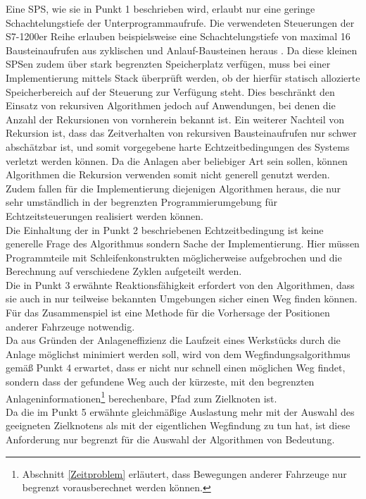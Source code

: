 		Eine \ac{SPS}, wie sie in Punkt 1 beschrieben wird, erlaubt nur eine geringe Schachtelungstiefe der Unterprogrammaufrufe. Die verwendeten Steuerungen der S7-1200er Reihe erlauben beispielsweise eine Schachtelungstiefe von maximal 16 Bausteinaufrufen aus zyklischen und Anlauf-Bausteinen heraus \cite{S7-1200}.  Da diese kleinen \ac{SPS}en zudem über stark begrenzten Speicherplatz verfügen, muss bei einer Implementierung  mittels Stack überprüft werden, ob der hierfür statisch allozierte Speicherbereich auf der Steuerung zur Verfügung steht. Dies beschränkt den Einsatz von rekursiven Algorithmen jedoch auf Anwendungen, bei denen die Anzahl der Rekursionen von vornherein bekannt ist. Ein weiterer Nachteil von Rekursion ist, dass das Zeitverhalten von rekursiven Bausteinaufrufen nur schwer abschätzbar ist, und somit vorgegebene harte Echtzeitbedingungen des Systems verletzt werden können. Da die Anlagen aber beliebiger Art sein sollen, können Algorithmen die Rekursion verwenden somit nicht generell genutzt werden. Zudem fallen für die Implementierung diejenigen Algorithmen heraus, die nur sehr umständlich in der begrenzten Programmierumgebung für Echtzeitsteuerungen realisiert werden können.
		\\[4pt]
		Die Einhaltung der in Punkt 2 beschriebenen Echtzeitbedingung ist keine generelle Frage des Algorithmus sondern Sache der Implementierung. Hier müssen Programmteile mit Schleifenkonstrukten möglicherweise aufgebrochen und die Berechnung auf verschiedene Zyklen aufgeteilt werden.
		\\[4pt]
		Die in Punkt 3 erwähnte Reaktionsfähigkeit erfordert von den Algorithmen, dass sie auch in nur teilweise bekannten Umgebungen sicher einen Weg finden können. Für das Zusammenspiel ist eine Methode für die Vorhersage der Positionen anderer Fahrzeuge notwendig.
		\\[4pt]
		Da aus Gründen der Anlageneffizienz die Laufzeit eines Werkstücks durch die Anlage möglichst minimiert werden soll, wird von dem Wegfindungsalgorithmus gemäß Punkt 4 erwartet, dass er nicht nur schnell einen möglichen Weg findet, sondern dass der gefundene Weg auch der kürzeste, mit den begrenzten Anlageninformationen\footnote{ Abschnitt \ref{Zeitproblem} erläutert, dass Bewegungen anderer Fahrzeuge nur begrenzt vorausberechnet werden können.} berechenbare, Pfad zum Zielknoten ist.
		\\[4pt]
		Da die im Punkt 5 erwähnte gleichmäßige Auslastung mehr mit der Auswahl des geeigneten Zielknotens als mit der eigentlichen Wegfindung zu tun hat, ist diese Anforderung nur begrenzt für die Auswahl der Algorithmen von Bedeutung.
		
